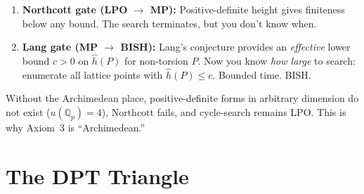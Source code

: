 \documentclass[11pt,twoside,openany]{report}
\theoremstyle{remark}
\newcommand{\BISH}{\textsf{BISH}}
\newcommand{\LPO}{\textsf{LPO}}
\newcommand{\MP}{\textsf{MP}}
\begin{document}
\begin{enumerate}
  \item \textbf{Northcott gate (\LPO{} $\to$ \MP):} Positive-definite height gives finiteness below any bound. The search terminates, but you don't know when.
  \item \textbf{Lang gate (\MP{} $\to$ \BISH):} Lang's conjecture provides an \emph{effective} lower bound $c > 0$ on $\hat{h}(P)$ for non-torsion $P$. Now you know \emph{how large} to search: enumerate all lattice points with $\hat{h}(P) \leq c$. Bounded time. \BISH.
\end{enumerate}

Without the Archimedean place, positive-definite forms in arbitrary dimension do not exist ($u(\mathbb{Q}_p) = 4$), Northcott fails, and cycle-search remains \LPO. This is why Axiom~3 is ``Archimedean.''


\section{The DPT Triangle}
\end{document}
